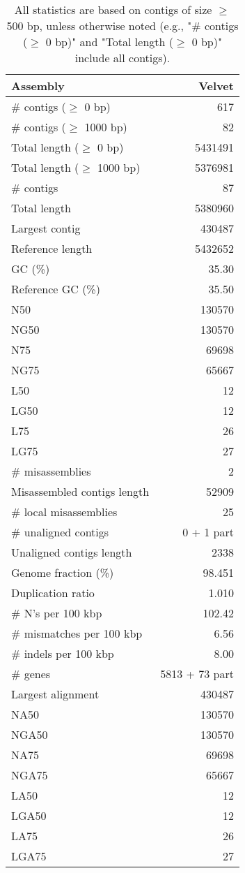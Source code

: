 \documentclass[12pt,a4paper]{article}
\begin{document}
\begin{table}[ht]
\begin{center}
\caption{All statistics are based on contigs of size $\geq$ 500 bp, unless otherwise noted (e.g., "\# contigs ($\geq$ 0 bp)" and "Total length ($\geq$ 0 bp)" include all contigs).}
\begin{tabular}{|l*{1}{|r}|}
\hline
Assembly & Velvet \\ \hline
\# contigs ($\geq$ 0 bp) & 617 \\ \hline
\# contigs ($\geq$ 1000 bp) & 82 \\ \hline
Total length ($\geq$ 0 bp) & 5431491 \\ \hline
Total length ($\geq$ 1000 bp) & 5376981 \\ \hline
\# contigs & 87 \\ \hline
Total length & 5380960 \\ \hline
Largest contig & 430487 \\ \hline
Reference length & 5432652 \\ \hline
GC (\%) & 35.30 \\ \hline
Reference GC (\%) & 35.50 \\ \hline
N50 & 130570 \\ \hline
NG50 & 130570 \\ \hline
N75 & 69698 \\ \hline
NG75 & 65667 \\ \hline
L50 & 12 \\ \hline
LG50 & 12 \\ \hline
L75 & 26 \\ \hline
LG75 & 27 \\ \hline
\# misassemblies & 2 \\ \hline
Misassembled contigs length & 52909 \\ \hline
\# local misassemblies & 25 \\ \hline
\# unaligned contigs & 0 + 1 part \\ \hline
Unaligned contigs length & 2338 \\ \hline
Genome fraction (\%) & 98.451 \\ \hline
Duplication ratio & 1.010 \\ \hline
\# N's per 100 kbp & 102.42 \\ \hline
\# mismatches per 100 kbp & 6.56 \\ \hline
\# indels per 100 kbp & 8.00 \\ \hline
\# genes & 5813 + 73 part \\ \hline
Largest alignment & 430487 \\ \hline
NA50 & 130570 \\ \hline
NGA50 & 130570 \\ \hline
NA75 & 69698 \\ \hline
NGA75 & 65667 \\ \hline
LA50 & 12 \\ \hline
LGA50 & 12 \\ \hline
LA75 & 26 \\ \hline
LGA75 & 27 \\ \hline
\end{tabular}
\end{center}
\end{table}
\end{document}
